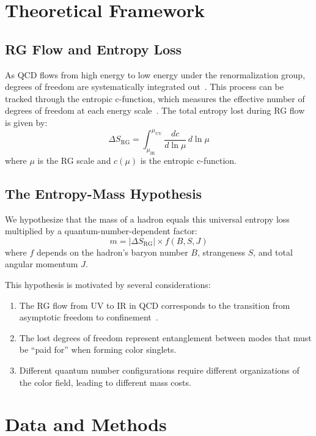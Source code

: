 \documentclass[12pt,a4paper]{article}
\begin{document}
\section{Theoretical Framework}

\subsection{RG Flow and Entropy Loss}

As QCD flows from high energy to low energy under the renormalization group, degrees of freedom are systematically integrated out~\cite{Polchinski1984,Wilson1974}. This process can be tracked through the entropic c-function, which measures the effective number of degrees of freedom at each energy scale~\cite{Braun2007}. The total entropy lost during RG flow is given by:
\begin{equation}
\Delta S_{\text{RG}} = \int_{\mu_{\text{IR}}}^{\mu_{\text{UV}}} \frac{dc}{d\ln\mu} \, d\ln\mu
\end{equation}
where $\mu$ is the RG scale and $c(\mu)$ is the entropic c-function.

\subsection{The Entropy-Mass Hypothesis}

We hypothesize that the mass of a hadron equals this universal entropy loss multiplied by a quantum-number-dependent factor:
\begin{equation}
m = |\Delta S_{\text{RG}}| \times f(B, S, J)
\end{equation}
where $f$ depends on the hadron's baryon number $B$, strangeness $S$, and total angular momentum $J$.

This hypothesis is motivated by several considerations:
\begin{enumerate}
\item The RG flow from UV to IR in QCD corresponds to the transition from asymptotic freedom to confinement~\cite{Gross1973}.
\item The lost degrees of freedom represent entanglement between modes that must be ``paid for'' when forming color singlets.
\item Different quantum number configurations require different organizations of the color field, leading to different mass costs.
\end{enumerate}

\section{Data and Methods}
\end{document}
